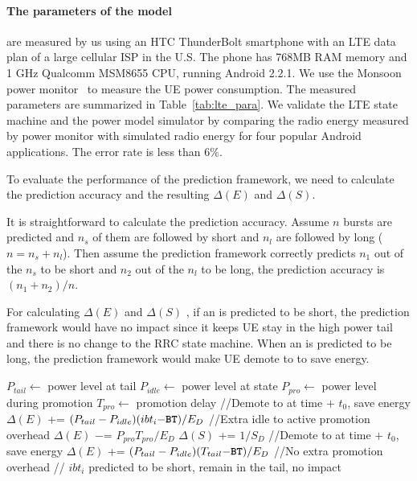 \paragraph{The parameters of the model} are measured by us using an HTC ThunderBolt smartphone with an LTE data plan of a large cellular ISP in the U.S. The phone has 768MB RAM memory and 1 GHz Qualcomm MSM8655 CPU, running Android 2.2.1. We use the Monsoon power monitor~\cite{monsoon} to measure the UE power consumption.
The measured parameters are summarized in Table~\ref{tab:lte_para}. We validate the LTE state machine and the power model simulator by comparing the radio energy measured by power monitor with simulated radio energy for four popular Android applications. The error rate is less than 6\%.

\label{sec:method.eval}


To evaluate the performance of the prediction framework, we need to calculate the prediction accuracy and the resulting $\Delta(E)$ and $\Delta(S)$.

It is straightforward to calculate the prediction accuracy. Assume $n$ bursts are predicted and $n_{s}$ of them are followed by short \IBTS and $n_{l}$ are followed by long \IBTS ($n = n_{s} + n_{l}$). Then assume the prediction framework correctly predicts $n_{1}$ out of the $n_{s}$ \IBTS to be short and $n_{2}$ out of the $n_{l}$ \IBTS to be long, the prediction accuracy is $(n_{1} + n_{2}) / n$.

For calculating $\Delta(E)$ and $\Delta(S)$ , if an \IBT is predicted to be short, the prediction framework would have no impact since it keeps UE stay in the high power tail and there is no change to the RRC state machine. When an \IBT is predicted to be long, the prediction framework would make UE demote to \RI to save energy.

\begin{algorithm}[t]
\begin{algorithmic}
\STATE $P_{tail} \leftarrow $ power level at \RC tail
\STATE $P_{idle} \leftarrow $ power level at \RI state
\STATE $P_{pro} \leftarrow $ power level during promotion
\STATE $T_{pro} \leftarrow $ promotion delay
\STATE //Demote to \RI at time \BT $+$ $t_{0}$, save energy
\STATE $\Delta(E) $ += $(P_{tail} - P_{idle}) (ibt_{i} - \BT) / E_{D}$
\STATE //Extra idle to active promotion overhead
\STATE $\Delta(E) $ $-$= $P_{pro} T_{pro} / E_{D}$
\STATE $\Delta(S) $ += $1 / S_{D}$
\ELSE
\STATE //Demote to \RI at time \BT$+$ $t_{0}$, save energy
\STATE $\Delta(E) $ += $(P_{tail} - P_{idle}) (T_{tail} - \BT) / E_{D}$
\STATE //No extra promotion overhead
\ENDIF
\ELSE
\STATE // $ibt_{i}$ predicted to be short, remain in the tail, no impact
\ENDIF
\end{algorithmic}
\label{algo:update}
\end{algorithm}



